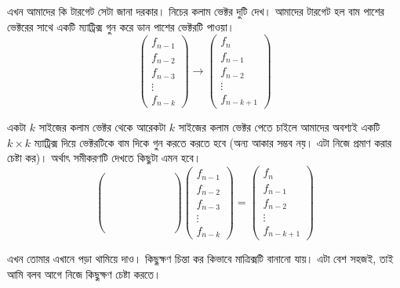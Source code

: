 \noindent এখন আমাদের কি টারগেট সেটা জানা দরকার। নিচের কলাম ভেক্টর দুটি দেখ। আমাদের টারগেট হল বাম পাশের ভেক্টরের সাথে একটি ম্যাট্রিক্স গুন করে ডান পাশের ভেক্টরটি পাওয়া।
$$
\begin{pmatrix}
f_{n - 1} \\
f_{n - 2} \\
f_{n - 3} \\
\vdots \\
f_{n - k}
\end{pmatrix}
\rightarrow
\begin{pmatrix}
f_{n} \\
f_{n - 1} \\
f_{n - 2} \\
\vdots \\
f_{n - k + 1}
\end{pmatrix}
$$

\noindent একটা $k$ সাইজের কলাম ভেক্টর থেকে আরেকটা $k$ সাইজের কলাম ভেক্টর পেতে চাইলে আমাদের অবশ্যই একটি $k \times k$ ম্যাট্রিক্স দিয়ে ভেক্টরটিকে বাম দিকে গুন করতে করতে হবে (অন্য আকার সম্ভব নয়। এটা নিজে প্রমাণ করার চেষ্টা কর)। অর্থাৎ সমীকরণটি দেখতে কিছুটা এমন হবে।
$$
\begin{pmatrix}
\phantom{a_1 \ a_2 \ a_3 \ \cdots \ a_k} \\
\phantom{a_1 \ a_2 \ a_3 \ \cdots \ a_k} \\
\phantom{a_1 \ a_2 \ a_3 \ \cdots \ a_k} \\
\phantom{a_1 \ a_2 \ a_3 \ \cdots \ a_k} \\
\phantom{a_1 \ a_2 \ a_3 \ \cdots \ a_k}
\end{pmatrix}
\begin{pmatrix}
f_{n - 1} \\
f_{n - 2} \\
f_{n - 3} \\
\vdots \\
f_{n - k}
\end{pmatrix}
=
\begin{pmatrix}
f_{n} \\
f_{n - 1} \\
f_{n - 2} \\
\vdots \\
f_{n - k + 1}
\end{pmatrix}
$$

\noindent এখন তোমার এখানে পড়া থামিয়ে দাও। কিছুক্ষণ চিন্তা কর কিভাবে মাত্রিক্সটি বানানো যায়। এটা বেশ সহজই, তাই আমি বলব আগে নিজে কিছুক্ষণ চেষ্টা করতে।

